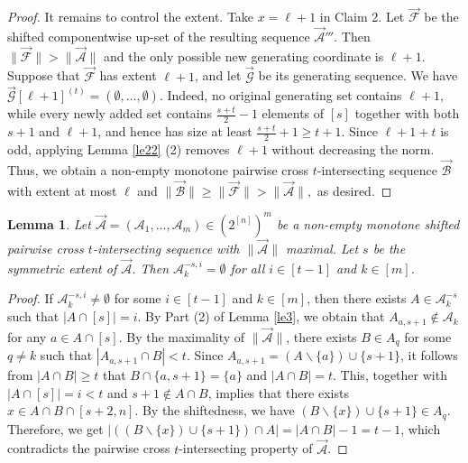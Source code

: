 \documentclass[11pt,a4paper]{article}
\newtheorem{lemma}[theorem]{Lemma}
\begin{document}
\begin{proof}
It remains to control the extent. Take $x=\ell+1$ in Claim 2.
Let $\vec{\mathcal F}$ be the shifted
componentwise up-set of the resulting sequence $\vec{\mathcal{A}}'''$.
 Then
$\|\vec{\mathcal F}\|>\|\vec{\mathcal A}\|$ and the only possible new
generating coordinate is $\ell+1$. 
Suppose that $\vec{\mathcal F}$ has extent $\ell+1$, and let
$\vec{\mathcal G}$ be its generating sequence. We have
$
  \vec{\mathcal G}[\ell+1]^{(t)}
  =(\emptyset,\ldots,\emptyset).
$
Indeed, no original generating set contains $\ell+1$, while every newly added
set contains $\frac{s+t}{2}-1$ elements of $[s]$ together with both $s+1$ and $\ell+1$,
and hence has size at least $\frac{s+t}{2}+1\ge t+1$. 
Since $\ell+1+t$ is odd,  applying Lemma \ref{le22} (2) removes $\ell+1$ without decreasing the norm. 
Thus, we obtain a non-empty monotone pairwise cross $t$-intersecting sequence
$\vec{\mathcal B}$ with extent at most $\ell$ and
$
  \|\vec{\mathcal B}\|\geq \|\vec{\mathcal F}\|>\|\vec{\mathcal A}\|,
$
as desired.
\end{proof}


\begin{lemma}\label{le34}
Let $\vec{\mathcal{A}} = (\mathcal{A}_1, \ldots, \mathcal{A}_m) \in (2^{[n]})^{m}$ be  a non-empty monotone shifted pairwise cross $t$-intersecting  sequence with $\|\vec{\mathcal{A}}\|$ maximal. Let   $s$ be  the  symmetric extent of $\vec{\mathcal{A}}$. Then $\mathcal{A}_{k}^{-s, i}=\emptyset$ for all $i\in [t-1]$ and $k\in [m]$.
\end{lemma} 
\begin{proof}
If  $\mathcal{A}_{k}^{-s, i}\neq\emptyset$ for some $i\in [t-1]$ and $k\in [m]$, then there exists $A\in\mathcal{A}_{k}^{-s}$ such that $ |A\cap[s]|=i $. By Part (2) of Lemma \ref{le3}, we obtain that  $A_{a,s+1} \notin \mathcal{A}_k$ for any  $a \in A\cap [s]$.
 By the maximality of 
$\|\vec{\mathcal{A}}\|$, there exists $B\in A_{q}$ for some $q\neq k$ such that $|A_{a,s+1}\cap B|<t$. Since $A_{a,s+1}=(A \backslash\{a\}) \cup\{s+1\}$, it follows from  $|A\cap B|\geq  t$ that
$B\cap \{a,s+1\}=\{a\}$ and $|A\cap B|= t$.
This, together with $ |A\cap[s]|=i<t $ and $s+1\notin A\cap B$, implies that there exists $x\in A\cap B\cap [s+2, n]$. By the shiftedness, we have $(B \backslash\{x\}) \cup\{s+1\}\in  A_{q}$.
Therefore, we get $|((B\backslash\{x\}) \cup\{s+1\})\cap A|=|A\cap B|-1= t-1$, which contradicts the pairwise cross $t$-intersecting property of 
$\vec{\mathcal{A}}$.
\end{proof}
\end{document}
